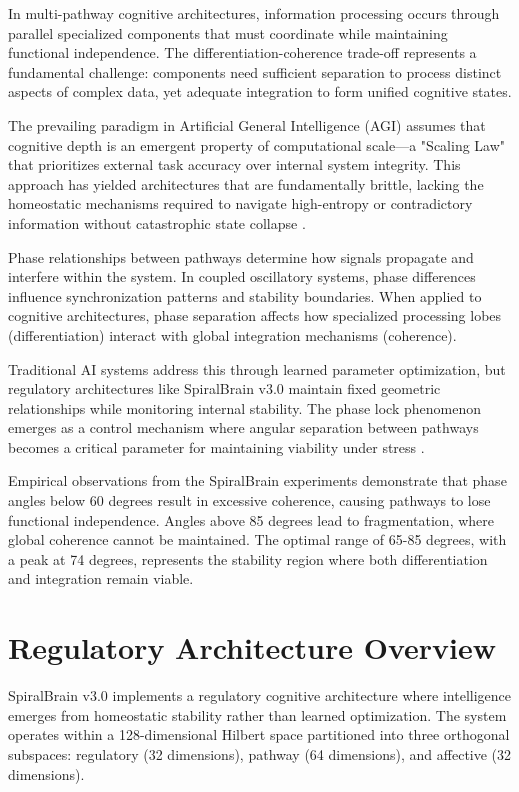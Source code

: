 \documentclass[12pt,a4paper]{report}
\begin{document}
In multi-pathway cognitive architectures, information processing occurs through parallel specialized components that must coordinate while maintaining functional independence. The differentiation-coherence trade-off represents a fundamental challenge: components need sufficient separation to process distinct aspects of complex data, yet adequate integration to form unified cognitive states.

The prevailing paradigm in Artificial General Intelligence (AGI) assumes that cognitive depth is an emergent property of computational scale—a "Scaling Law" that prioritizes external task accuracy over internal system integrity. This approach has yielded architectures that are fundamentally brittle, lacking the homeostatic mechanisms required to navigate high-entropy or contradictory information without catastrophic state collapse \cite{Cragin2026Thesis}.

Phase relationships between pathways determine how signals propagate and interfere within the system. In coupled oscillatory systems, phase differences influence synchronization patterns and stability boundaries. When applied to cognitive architectures, phase separation affects how specialized processing lobes (differentiation) interact with global integration mechanisms (coherence).

Traditional AI systems address this through learned parameter optimization, but regulatory architectures like SpiralBrain v3.0 maintain fixed geometric relationships while monitoring internal stability. The phase lock phenomenon emerges as a control mechanism where angular separation between pathways becomes a critical parameter for maintaining viability under stress \cite{Cragin2026RI}.

Empirical observations from the SpiralBrain experiments demonstrate that phase angles below 60 degrees result in excessive coherence, causing pathways to lose functional independence. Angles above 85 degrees lead to fragmentation, where global coherence cannot be maintained. The optimal range of 65-85 degrees, with a peak at 74 degrees, represents the stability region where both differentiation and integration remain viable.

\section{Regulatory Architecture Overview}

SpiralBrain v3.0 implements a regulatory cognitive architecture where intelligence emerges from homeostatic stability rather than learned optimization. The system operates within a 128-dimensional Hilbert space partitioned into three orthogonal subspaces: regulatory (32 dimensions), pathway (64 dimensions), and affective (32 dimensions).
\end{document}
